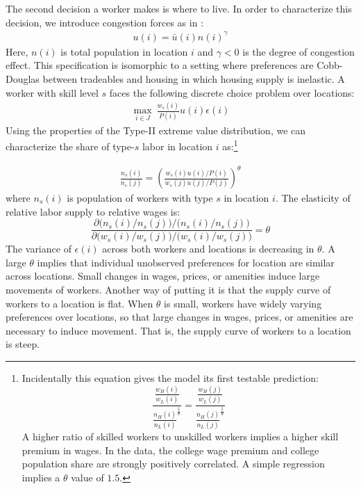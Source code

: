 \documentclass[12 pt]{article}
\begin{document}
The second decision a worker makes is where to live.  In order to characterize this decision, we introduce congestion forces as in \citet{allen2014trade}:
\begin{eqnarray}\label{eq:congestion}
u(i) = \bar{u}(i)  n(i)^{\gamma}
\end{eqnarray}
Here, $n(i)$ is total population in location $i$ and $\gamma<0$ is the degree of congestion effect. This specification is isomorphic to a setting where preferences are Cobb-Douglas between tradeables and housing in which housing supply is inelastic.
A worker with skill level $s$ faces the following discrete choice problem over locations:
\begin{eqnarray} 
\max_{i \in J}~ \frac{w_s(i)}{P(i)}u(i) \epsilon(i)  \nonumber
\end{eqnarray}
Using the properties of the Type-II extreme value distribution, we can characterize the share of type-$s$ labor in location $i$ as:\footnote{Incidentally this equation gives the model its first testable prediction:
    \begin{equation*}
        \frac{\frac{w_H(i)}{w_L(i)}}{\frac{n_H(i)}{n_L(i)}^\frac{1}{\theta}} = \frac{\frac{w_H(j)}{w_L(j)}}{\frac{n_H(j)}{n_L(j)}^\frac{1}{\theta}}
    \end{equation*}
    A higher ratio of skilled workers to unskilled workers implies a higher skill premium in wages.  In the data, the college wage premium and college population share are strongly positively correlated.  A simple regression implies a $\theta$ value of $1.5$.}

\begin{eqnarray}
    \frac{n_s(i)}{n_s(j)} = \left(
	\frac{w_s(i)u(i)/P(i)}
	{w_s(j)u(j) /P(j)}\right)^\theta
    \label{eq:rel_pops}
\end{eqnarray} 
where $n_s(i)$ is population of workers with type $s$ in location $i$.
The elasticity of relative labor supply to relative wages is:
\[
\frac{ \partial \Big(n_s(i)/n_s(j)\Big) \Big/
\Big(n_s(i)/n_s(j)\Big)}
{\partial \Big(w_s(i)/w_s(j)\Big) \Big/
\Big(w_s(i)/w_s(j)\Big) } = \theta
\]
The variance of $\epsilon(i)$ across both workers and locations is decreasing in $\theta$. A large $\theta$ implies that individual unobserved preferences for location are similar across locations. Small changes in wages, prices, or amenities induce large movements of workers.  Another way of putting it is that the supply curve of workers to a location is flat.  When $\theta$ is small, workers have widely varying preferences over locations, so that large changes in wages, prices, or amenities are necessary to induce movement.  That is, the supply curve of workers to a location is steep.
\end{document}
